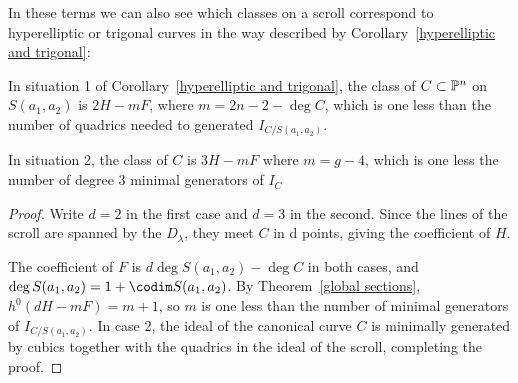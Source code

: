 In these terms we can also see which classes on a scroll correspond to hyperelliptic or trigonal curves in the way described by Corollary~\ref{hyperelliptic and trigonal}:

\begin{corollary}\label{which class}
In situation 1 of Corollary~\ref{hyperelliptic and trigonal}, the class of $C\subset \PP^n$ on $S(a_1,a_2)$ is
$2H - mF$, where $m =  2n-2 - \deg C$, which is one less than the number of quadrics needed to generated $I_{C/S(a_1,a_2)}$.

In situation 2, the class of $C$ is 
$3H -  mF$ where $m = g-4$, which is one less the number of degree 3 minimal generators of $I_{C}$
\end{corollary}

\begin{proof} Write $d=2$ in the first case and $d=3$ in the second.
Since the lines of the scroll are spanned by the $D_\lambda$, they meet $C$ in d points, 
giving the coefficient of $H$. 

The coefficient of $F$ is $d\deg S(a_1,a_2) - \deg C$ in both cases, and 
$\deg S(a_1,a_2)= 1+ \codim  S(a_1,a_2)$. By Theorem~\ref{global sections}, 
$h^0(dH-mF) = m+1$, so $m$ is one less than the number of minimal generators
of $I_{C/S(a_1,a_2)}$. In case 2, the ideal of the canonical curve $C$ is minimally
generated by cubics together with  the quadrics in the ideal of the scroll, completing the proof. \end{proof}


%




%


